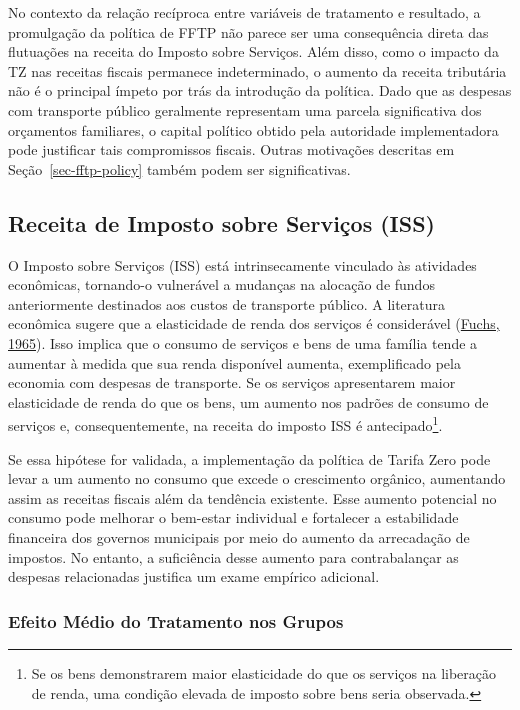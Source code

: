 \documentclass[12pt, a4paper, twoside]{article}
\numberwithin{equation}{subsection} %
\begin{document}
No contexto da relação recíproca entre variáveis
\hspace{0pt}\hspace{0pt}de tratamento e resultado, a promulgação da
política de FFTP não parece ser uma consequência direta das flutuações
na receita do Imposto sobre Serviços. Além disso, como o impacto da TZ
nas receitas fiscais permanece indeterminado, o aumento da receita
tributária não é o principal ímpeto por trás da introdução da política.
Dado que as despesas com transporte público geralmente representam uma
parcela significativa dos orçamentos familiares, o capital político
obtido pela autoridade implementadora pode justificar tais compromissos
fiscais. Outras motivações descritas em Seção~\ref{sec-fftp-policy}
também podem ser significativas.

\hypertarget{sec-iss-results}{%
\subsection{Receita de Imposto sobre Serviços
(ISS)}\label{sec-iss-results}}

O Imposto sobre Serviços (ISS) está intrinsecamente vinculado às
atividades econômicas, tornando-o vulnerável a mudanças na alocação de
fundos anteriormente destinados aos custos de transporte público. A
literatura econômica sugere que a elasticidade de renda dos serviços é
considerável (\protect\hyperlink{ref-fuchs_1965}{Fuchs, 1965}). Isso
implica que o consumo de serviços e bens de uma família tende a aumentar
à medida que sua renda disponível aumenta, exemplificado pela economia
com despesas de transporte. Se os serviços apresentarem maior
elasticidade de renda do que os bens, um aumento nos padrões de consumo
de serviços e, consequentemente, na receita do imposto ISS é
antecipado\footnote{Se os bens demonstrarem maior elasticidade do que os
  serviços na liberação de renda, uma condição elevada de imposto sobre
  bens seria observada.}.

Se essa hipótese for validada, a implementação da política de Tarifa
Zero pode levar a um aumento no consumo que excede o crescimento
orgânico, aumentando assim as receitas fiscais além da tendência
existente. Esse aumento potencial no consumo pode melhorar o bem-estar
individual e fortalecer a estabilidade financeira dos governos
municipais por meio do aumento da arrecadação de impostos. No entanto, a
suficiência desse aumento para contrabalançar as despesas relacionadas
justifica um exame empírico adicional.

\hypertarget{efeito-muxe9dio-do-tratamento-nos-grupos}{%
\subsubsection{Efeito Médio do Tratamento nos
Grupos}\label{efeito-muxe9dio-do-tratamento-nos-grupos}}
\end{document}
